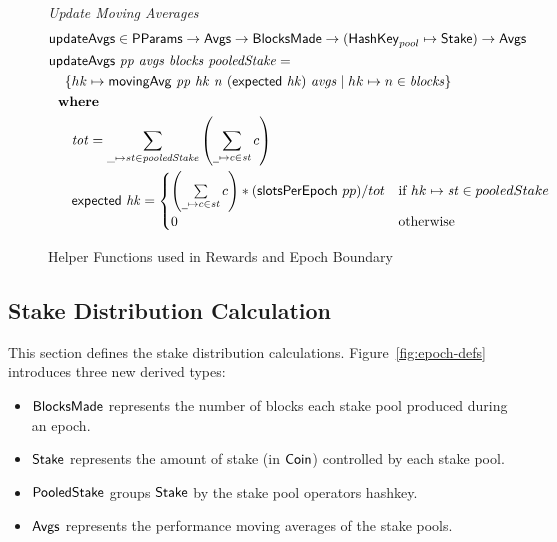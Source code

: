\begin{figure}[htb]
  \emph{Update Moving Averages}
  \begin{align*}
      & \fun{updateAvgs} \in \PParams \to \Avgs \to \BlocksMade \to
          (\HashKey_{pool}\mapsto \Stake) \to \Avgs \\
      & \updateAvgs{pp}{avgs}{blocks}{pooledStake} = \\
      & ~~~ \left\{hk\mapsto \movingAvg{pp}{hk}{n}{(\fun{expected}~hk)}{avgs}
            \mid
            hk\mapsto n\in\var{blocks}
            \right\} \\
      & \where \\
      & ~~~~~ \var{tot} = \sum_{\_\mapsto st\in \var{pooledStake}}
                          \left(\sum_{\wcard\mapsto c\in\var{st}}c\right) \\
      & ~~~~~ \fun{expected}~\var{hk} =
                \begin{cases}
                  \left(\sum\limits_{
                    \wcard\mapsto c\in\var{st}}c\right)*(\fun{slotsPerEpoch}~{pp}) / tot
                  &
                  \text{if } hk\mapsto\var{st} \in pooledStake \\
                  0 & \text{otherwise}
                \end{cases}
  \end{align*}
  \caption{Helper Functions used in Rewards and Epoch Boundary}
  \label{fig:funcs:epoch-helper}
\end{figure}

\subsection{Stake Distribution Calculation}
\label{sec:stake-dist}

This section defines the stake distribution calculations.
Figure~\ref{fig:epoch-defs} introduces three new derived types:
\begin{itemize}
  \item $\mathsf{BlocksMade}$ represents the number of blocks each stake pool produced
    during an epoch.
  \item $\mathsf{Stake}$ represents the amount of stake (in $\mathsf{Coin}$) controlled by each
    stake pool.
  \item $\mathsf{PooledStake}$ groups $\mathsf{Stake}$ by the stake pool operators hashkey.
  \item $\mathsf{Avgs}$ represents the performance moving averages of the stake pools.
\end{itemize}

